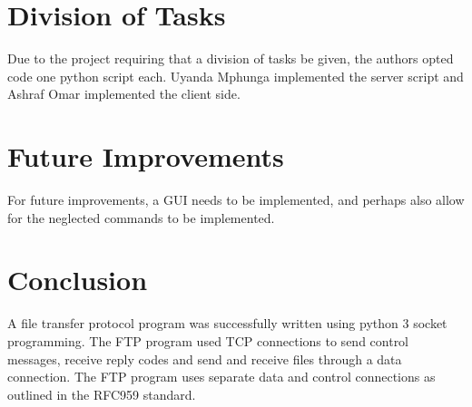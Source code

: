 \documentclass[journal, a4paper]{IEEEtran}
\begin{document}
\section{Division of Tasks}

Due to the project requiring that a division of tasks be given, the authors opted code one python script each. Uyanda Mphunga implemented the server script and Ashraf Omar implemented the client side.

\section{Future Improvements}

For future improvements, a GUI needs to be implemented, and perhaps also allow for the neglected commands to be implemented.

\section{Conclusion}
A file transfer protocol program was successfully written using python 3 socket programming. The FTP program used TCP connections to send control messages, receive reply codes and send and receive files through a data connection. The FTP program uses separate data and control connections as outlined in the RFC959 standard.
%
\onecolumn



\end{document}
